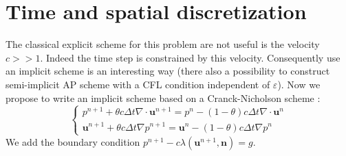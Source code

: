 \documentclass[a4paper,twoside,french,english,11pt]{article}
\newcommand{\ds}{\displaystyle}
\newcommand{\eps}{\varepsilon}
\begin{document}
\section{Time and spatial discretization}
The classical explicit scheme for this problem are not useful is the velocity $c>>1$. Indeed the time step is constrained by this velocity. Consequently use an implicit scheme is an interesting way (there also a possibility to construct semi-implicit AP scheme with a CFL condition independent of $\eps$). Now we propose to write an implicit scheme based on a Cranck-Nicholson scheme :
$$
\left\{\begin{array}{l}
\ds p^{n+1} + \theta c\Delta t \nabla \cdot \mathbf{u}^{n+1}=  p^n- (1-\theta) c \Delta t   \nabla \cdot \mathbf{u}^{n}\\
\ds \mathbf{u}^{n+1}+\theta c \Delta t \nabla p^{n+1}= \mathbf{u}^n-(1-\theta ) c\Delta t \nabla p^{n}\end{array}\right.
$$
We add the boundary condition $p^{n+1}-c \lambda (\bm{u}^{n+1},\bm{n})=g$.
\end{document}
